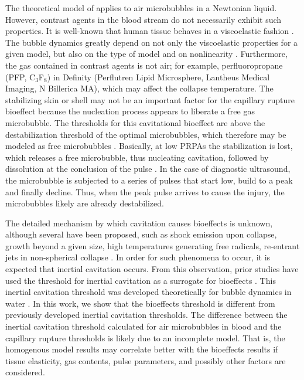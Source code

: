 The theoretical model of \cite{Apfel1991} applies to air microbubbles
in a Newtonian liquid. However, contrast agents in the blood stream do
not necessarily exhibit such properties. It is well-known that human
tissue behaves in a viscoelastic fashion
\cite[]{Frizzell1976,Madsen1983}. The bubble dynamics greatly depend
on not only the viscoelastic properties \cite[]{Allen2000a,Yang2005}
for a given model, but also on the type of model \cite[]{Johnsen2012}
and on nonlinearity \cite[]{Allen2000b}. Furthermore, the gas
contained in contrast agents is not air; for example, perfluoropropane
(PFP, C$_3$F$_8$) in Definity (Perflutren Lipid Microsphere, Lantheus
Medical Imaging, N Billerica MA), which may affect the collapse
temperature.  The stabilizing skin or shell may not be an important
factor for the capillary rupture bioeffect because the nucleation
process appears to liberate a free gas microbubble. The thresholds for
this cavitational bioeffect are above the destabilization threshold of
the optimal microbubbles, which therefore may be modeled as free
microbubbles \cite[]{Sboros2002,Marmottant2005}.  Basically, at low
PRPAs the stabilization is lost, which releases a free microbubble,
thus nucleating cavitation, followed by dissolution at the conclusion
of the pulse \cite[]{Porter2006}.  In the case of diagnostic
ultrasound, the microbubble is subjected to a series of pulses that
start low, build to a peak and finally decline.  Thus, when the peak
pulse arrives to cause the injury, the microbubbles likely are already
destabilized.

The detailed mechanism by which cavitation causes bioeffects is
unknown, although several have been proposed, such as shock emission
upon collapse, growth beyond a given size, high temperatures
generating free radicals, re-entrant jets in non-spherical collapse
\cite[]{Nyborg2002}. In order for such phenomena to occur, it is
expected that inertial cavitation occurs. From this observation, prior
studies have used the threshold for inertial cavitation as a surrogate
for bioeffects \cite[]{Yang2005}. This inertial cavitation threshold
was developed theoretically for bubble dynamics in water
\cite[]{Flynn1975}. In this work, we show that the bioeffects
threshold is different from previously developed inertial cavitation
thresholds. The difference between the inertial cavitation threshold
calculated for air microbubbles in blood and the capillary rupture
thresholds is likely due to an incomplete model.  That is, the
homogenous model results may correlate better with the bioeffects
results if tissue elasticity, gas contents, pulse parameters, and
possibly other factors are considered.  

